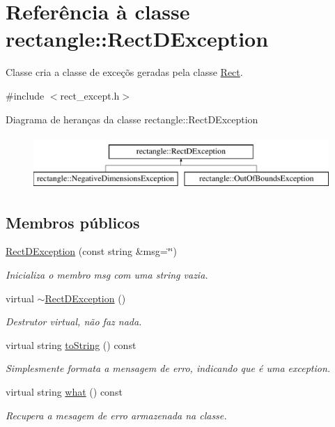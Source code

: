 \hypertarget{classrectangle_1_1RectDException}{\section{Referência à classe rectangle\-:\-:Rect\-D\-Exception}
\label{classrectangle_1_1RectDException}
}


Classe cria a classe de exce\c{c}\~{o}s geradas pela classe \hyperlink{classrectangle_1_1Rect}{Rect}.  




{\ttfamily \#include $<$rect\-\_\-except.\-h$>$}

Diagrama de heranças da classe rectangle\-:\-:Rect\-D\-Exception\begin{figure}[H]
\begin{center}
\leavevmode
\includegraphics[height=2.000000cm]{classrectangle_1_1RectDException}
\end{center}
\end{figure}
\subsection*{Membros públicos}
\begin{DoxyCompactItemize}
\item 
\hyperlink{classrectangle_1_1RectDException_aba80bb7ca6416979440cc0aeb8544888}{Rect\-D\-Exception} (const string \&msg=\char`\"{}\char`\"{})
\begin{DoxyCompactList}\small\item\em Inicializa o membro msg com uma string vazia. \end{DoxyCompactList}\item 
virtual \hyperlink{classrectangle_1_1RectDException_a0e7774627aac6686259d373a1b008858}{$\sim$\-Rect\-D\-Exception} ()
\begin{DoxyCompactList}\small\item\em Destrutor virtual, n\~{a}o faz nada. \end{DoxyCompactList}\item 
virtual string \hyperlink{classrectangle_1_1RectDException_a233f2508115296c2e15e574aad000daf}{to\-String} () const 
\begin{DoxyCompactList}\small\item\em Simplesmente formata a mensagem de erro, indicando que \'{e} uma exception. \end{DoxyCompactList}\item 
virtual string \hyperlink{classrectangle_1_1RectDException_aac989318d66a6548295e37611309eea8}{what} () const 
\begin{DoxyCompactList}\small\item\em Recupera a mesagem de erro armazenada na classe. \end{DoxyCompactList}\end{DoxyCompactItemize}


